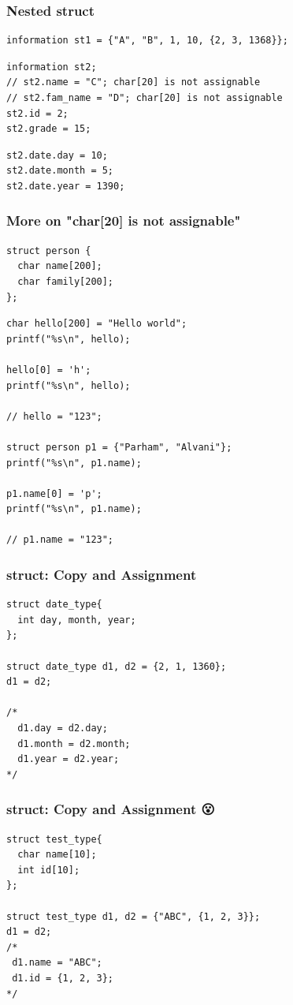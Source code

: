\documentclass{../c-lecture}
\begin{document}
\begin{frame}[fragile]
  \frametitle{Nested struct}
  \begin{verbatim}
information st1 = {"A", "B", 1, 10, {2, 3, 1368}};
  \end{verbatim}
  \begin{verbatim}
information st2;
// st2.name = "C"; char[20] is not assignable
// st2.fam_name = "D"; char[20] is not assignable
st2.id = 2;
st2.grade = 15;
  \end{verbatim}
  \begin{verbatim}
st2.date.day = 10;
st2.date.month = 5;
st2.date.year = 1390;
  \end{verbatim}
\end{frame}
\begin{frame}[fragile]
  \frametitle{More on "char[20] is not assignable"}
  \begin{verbatim}
struct person {
  char name[200];
  char family[200];
};
  \end{verbatim}
  \begin{verbatim}
char hello[200] = "Hello world";
printf("%s\n", hello);

hello[0] = 'h';
printf("%s\n", hello);

// hello = "123";

struct person p1 = {"Parham", "Alvani"};
printf("%s\n", p1.name);

p1.name[0] = 'p';
printf("%s\n", p1.name);

// p1.name = "123";
  \end{verbatim}
\end{frame}

\begin{frame}[fragile]
  \frametitle{struct: Copy and Assignment}
  \begin{verbatim}
struct date_type{
  int day, month, year;
};

struct date_type d1, d2 = {2, 1, 1360};
d1 = d2;

/*
  d1.day = d2.day;
  d1.month = d2.month;
  d1.year = d2.year;
*/
  \end{verbatim}
\end{frame}

\begin{frame}[fragile]
  \frametitle{struct: Copy and Assignment 😮}
  \begin{verbatim}
struct test_type{
  char name[10];
  int id[10];
};

struct test_type d1, d2 = {"ABC", {1, 2, 3}};
d1 = d2;
/*
 d1.name = "ABC";
 d1.id = {1, 2, 3};
*/

  \end{verbatim}
\end{frame}
\end{document}
